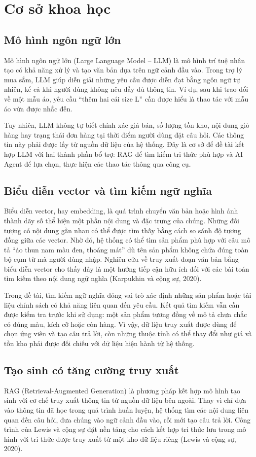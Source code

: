 \documentclass[12pt,a4paper,oneside]{report}
\begin{document}
\chapter{Cơ sở khoa học}
\section{Mô hình ngôn ngữ lớn}
Mô hình ngôn ngữ lớn (Large Language Model – LLM) là mô hình trí tuệ nhân tạo có khả năng xử lý và tạo văn bản dựa trên ngữ cảnh đầu vào. Trong trợ lý mua sắm, LLM giúp diễn giải những yêu cầu được diễn đạt bằng ngôn ngữ tự nhiên, kể cả khi người dùng không nêu đầy đủ thông tin. Ví dụ, sau khi trao đổi về một mẫu áo, yêu cầu “thêm hai cái size L” cần được hiểu là thao tác với mẫu áo vừa được nhắc đến.

Tuy nhiên, LLM không tự biết chính xác giá bán, số lượng tồn kho, nội dung giỏ hàng hay trạng thái đơn hàng tại thời điểm người dùng đặt câu hỏi. Các thông tin này phải được lấy từ nguồn dữ liệu của hệ thống. Đây là cơ sở để đề tài kết hợp LLM với hai thành phần bổ trợ: RAG để tìm kiếm tri thức phù hợp và AI Agent để lựa chọn, thực hiện các thao tác thông qua công cụ.

\section{Biểu diễn vector và tìm kiếm ngữ nghĩa}
Biểu diễn vector, hay embedding, là quá trình chuyển văn bản hoặc hình ảnh thành dãy số thể hiện một phần nội dung và đặc trưng của chúng. Những đối tượng có nội dung gần nhau có thể được tìm thấy bằng cách so sánh độ tương đồng giữa các vector. Nhờ đó, hệ thống có thể tìm sản phẩm phù hợp với câu mô tả “áo thun nam màu đen, thoáng mát” dù tên sản phẩm không chứa đúng toàn bộ cụm từ mà người dùng nhập. Nghiên cứu về truy xuất đoạn văn bản bằng biểu diễn vector cho thấy đây là một hướng tiếp cận hữu ích đối với các bài toán tìm kiếm theo nội dung ngữ nghĩa (Karpukhin và cộng sự, 2020). \cite{karpukhin2020}

Trong đề tài, tìm kiếm ngữ nghĩa đóng vai trò xác định những sản phẩm hoặc tài liệu chính sách có khả năng liên quan đến yêu cầu. Kết quả tìm kiếm vẫn cần được kiểm tra trước khi sử dụng: một sản phẩm tương đồng về mô tả chưa chắc có đúng màu, kích cỡ hoặc còn hàng. Vì vậy, dữ liệu truy xuất được dùng để chọn ứng viên và tạo câu trả lời, còn những thuộc tính có thể thay đổi như giá và tồn kho phải được đối chiếu với dữ liệu hiện hành từ hệ thống.

\section{Tạo sinh có tăng cường truy xuất}
RAG (Retrieval-Augmented Generation) là phương pháp kết hợp mô hình tạo sinh với cơ chế truy xuất thông tin từ nguồn dữ liệu bên ngoài. Thay vì chỉ dựa vào thông tin đã học trong quá trình huấn luyện, hệ thống tìm các nội dung liên quan đến câu hỏi, đưa chúng vào ngữ cảnh đầu vào, rồi mới tạo câu trả lời. Công trình của Lewis và cộng sự đặt nền tảng cho cách kết hợp tri thức lưu trong mô hình với tri thức được truy xuất từ một kho dữ liệu riêng (Lewis và cộng sự, 2020). \cite{lewis2020}
\end{document}
